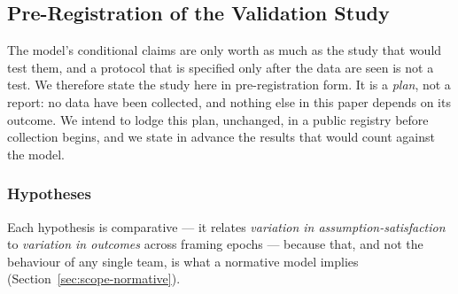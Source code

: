 \documentclass[11pt]{article}
\begin{document}
\subsection{Pre-Registration of the Validation Study}
\label{sec:prereg}

The model's conditional claims are only worth as much as the study that would test them, and a protocol that is specified only after the data are seen is not a test. We therefore state the study here in pre-registration form. It is a \emph{plan}, not a report: no data have been collected, and nothing else in this paper depends on its outcome. We intend to lodge this plan, unchanged, in a public registry before collection begins, and we state in advance the results that would count against the model.

\subsubsection*{Hypotheses}

Each hypothesis is comparative --- it relates \emph{variation in assumption-satisfaction} to \emph{variation in outcomes} across framing epochs --- because that, and not the behaviour of any single team, is what a normative model implies (Section~\ref{sec:scope-normative}).
\end{document}
